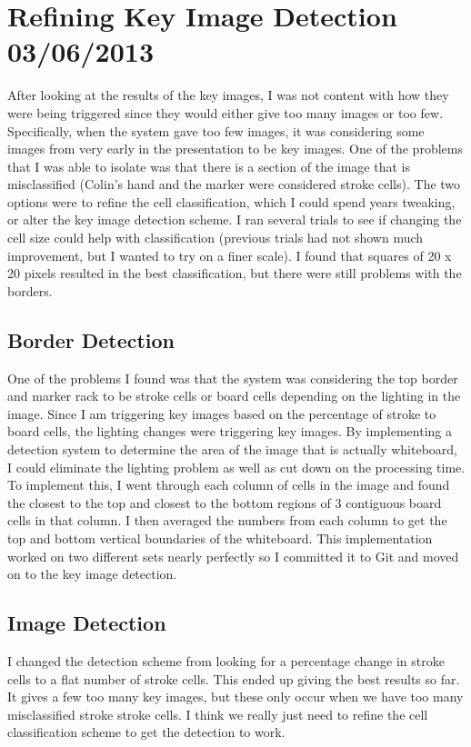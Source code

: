 \documentclass[]{article}
\begin{document}
	\section{Refining Key Image Detection 03/06/2013}
		After looking at the results of the key images, I was not content with how they were being triggered since they would either give too many images or too few. Specifically, when the system gave too few images, it was considering some images from very early in the presentation to be key images. One of the problems that I was able to isolate was that there is a section of the image that is misclassified (Colin's hand and the marker were considered stroke cells). The two options were to refine the cell classification, which I could spend years tweaking, or alter the key image detection scheme. I ran several trials to see if changing the cell size could help with classification (previous trials had not shown much improvement, but I wanted to try on a finer scale). I found that squares of 20 x 20 pixels resulted in the best classification, but there were still problems with the borders. 
		
		\subsection{Border Detection}
			One of the problems I found was that the system was considering the top border and marker rack to be stroke cells or board cells depending on the lighting in the image. Since I am triggering key images based on the percentage of stroke to board cells, the lighting changes were triggering key images. By implementing a detection system to determine the area of the image that is actually whiteboard, I could eliminate the lighting problem as well as cut down on the processing time. To implement this, I went through each column of cells in the image and found the closest to the top and closest to the bottom regions of 3 contiguous board cells in that column. I then averaged the numbers from each column to get the top and bottom vertical boundaries of the whiteboard. This implementation worked on two different sets nearly perfectly so I committed it to Git and moved on to the key image detection.
			
		\subsection{Image Detection}
			I changed the detection scheme from looking for a percentage change in stroke cells to a flat number of stroke cells. This ended up giving the best results so far. It gives a few too many key images, but these only occur when we have too many misclassified stroke stroke cells. I think we really just need to refine the cell classification scheme to get the detection to work. 
			
\end{document}
